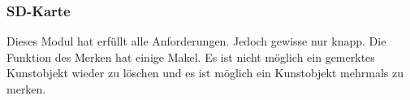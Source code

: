 \subsubsection{SD-Karte}
Dieses Modul hat erfüllt alle Anforderungen. Jedoch gewisse nur knapp. Die Funktion des Merken hat einige Makel. Es ist nicht möglich ein gemerktes Kunstobjekt wieder zu löschen und es ist möglich ein Kunstobjekt mehrmals zu merken.


